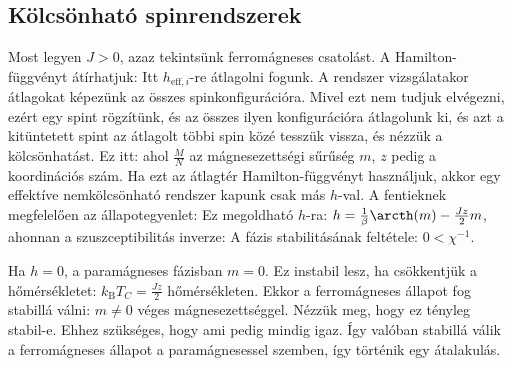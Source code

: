   \subsection{Kölcsönható spinrendszerek}
   
   Most legyen $J>0$, azaz tekintsünk ferromágneses csatolást.
   A Hamilton-függvényt átírhatjuk:
   Itt $h_{\text{eff},i}$-re átlagolni fogunk.
   A rendszer vizsgálatakor átlagokat képezünk az összes spinkonfigurációra.
   Mivel ezt nem tudjuk elvégezni, ezért egy spint rögzítünk, és az összes ilyen konfigurációra átlagolunk ki, és azt a kitüntetett spint az átlagolt többi spin közé tesszük vissza, és nézzük a kölcsönhatást.
   Ez itt:
   ahol $\frac{M}{N}$ az mágnesezettségi sűrűség $m$, $z$ pedig a koordinációs szám.
   Ha ezt az átlagtér Hamilton-függvényt használjuk, akkor egy effektíve nemkölcsönható rendszer kapunk csak más $h$-val.
   A fentieknek megfelelően az állapotegyenlet:
   Ez megoldható $h$-ra: $h=\frac{1}{\beta}\arcth(m)-\frac{Jz}{2}m$, ahonnan a szuszceptibilitás inverze:
   A fázis stabilitásának feltétele: $0<\chi^{-1}$. 
   
   Ha $h=0$, a paramágneses fázisban $m=0$.
   Ez instabil lesz, ha csökkentjük a hőmérsékletet: $k_\text{B}T_C=\frac{Jz}{2}$ hőmérsékleten.
   Ekkor a ferromágneses állapot fog stabillá válni: $m\ne 0$ véges mágnesezettséggel.
   Nézzük meg, hogy ez tényleg stabil-e.
   Ehhez szükséges, hogy 
   ami pedig mindig igaz. Így valóban stabillá válik a ferromágneses állapot a paramágnesessel szemben, így történik egy átalakulás. 
   
